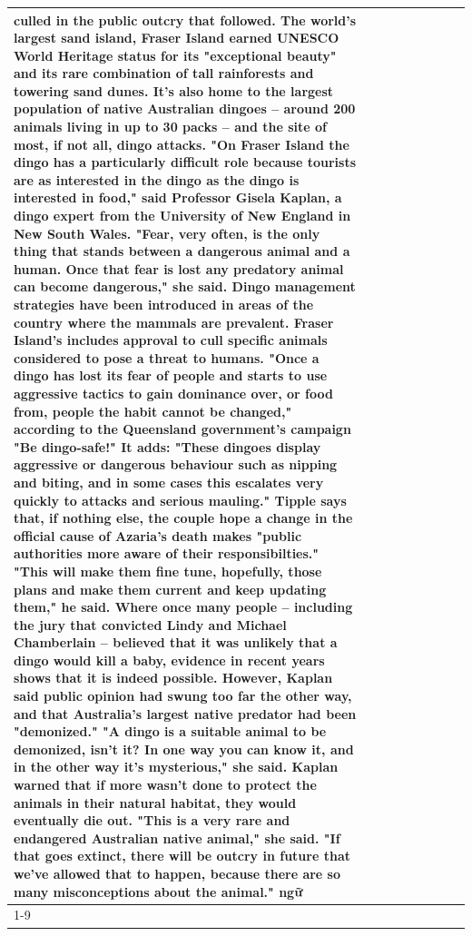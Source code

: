 \begin{table}[H]
\begin{tabular}{lllrlllll}
culled in the public outcry that followed. The world's largest sand island, Fraser Island earned UNESCO World Heritage status for its "exceptional beauty" and its rare combination of tall rainforests and towering sand dunes. It's also home to the largest population of native Australian dingoes -- around 200 animals living in up to 30 packs -- and the site of most, if not all, dingo attacks. "On Fraser Island the dingo has a particularly difficult role because tourists are as interested in the dingo as the dingo is interested in food," said Professor Gisela Kaplan, a dingo expert from the University of New England in New South Wales. "Fear, very often, is the only thing that stands between a dangerous animal and a human. Once that fear is lost any predatory animal can become dangerous," she said. Dingo management strategies have been introduced in areas of the country where the mammals are prevalent. Fraser Island's includes approval to cull specific animals considered to pose a threat to humans. "Once a dingo has lost its fear of people and starts to use aggressive tactics to gain dominance over, or food from, people the habit cannot be changed," according to the Queensland government's campaign "Be dingo-safe!" It adds: "These dingoes display aggressive or dangerous behaviour such as nipping and biting, and in some cases this escalates very quickly to attacks and serious mauling." Tipple says that, if nothing else, the couple hope a change in the official cause of Azaria's death makes "public authorities more aware of their responsibilties." "This will make them fine tune, hopefully, those plans and make them current and keep updating them," he said. Where once many people -- including the jury that convicted Lindy and Michael Chamberlain -- believed that it was unlikely that a dingo would kill a baby, evidence in recent years shows that it is indeed possible. However, Kaplan said public opinion had swung too far the other way, and that Australia's largest native predator had been "demonized." "A dingo is a suitable animal to be demonized, isn't it? In one way you can know it, and in the other way it's mysterious," she said. Kaplan warned that if more wasn't done to protect the animals in their natural habitat, they would eventually die out. "This is a very rare and endangered Australian native animal," she said. "If that goes extinct, there will be outcry in future that we've allowed that to happen, because there are so many misconceptions about the animal." ngữ \\
\cline{1-9}

\end{tabular}
\end{table}
